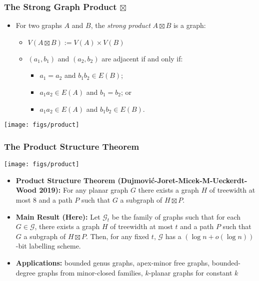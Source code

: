 \documentclass[xcolor=dvipsnames]{beamer}
\begin{document}
\begin{frame}
    \frametitle{The Strong Graph Product $\boxtimes$}

    \begin{itemize}
        \item[] For two graphs $A$ and $B$, the \emph{strong product} $A\boxtimes B$ is a graph:
        \begin{itemize}
            \item $V(A\boxtimes B):=V(A)\times V(B)$
            \item $(a_1,b_1)$ and $(a_2,b_2)$ are adjacent if and only if:
            \begin{itemize}
                \item $a_1=a_2$ and $b_1b_2\in E(B)$;
                \item $a_1a_2 \in E(A)$ and $b_1=b_2$; or
                \item  $a_1a_2 \in E(A)$ and $b_1b_2 \in E(B)$.
            \end{itemize}
        \end{itemize}
    \end{itemize}
    \begin{center}
        \texttt{[image: figs/product]}
    \end{center}
\end{frame}


\begin{frame}
    \frametitle{The Product Structure Theorem}

    \begin{center}
        \texttt{[image: figs/product]}
    \end{center}

    \begin{itemize}
        \item<+->\textbf{Product Structure Theorem (Dujmović-Joret-Micek-M-Ueckerdt-Wood 2019):} For any planar graph $G$ there exists a graph $H$ of treewidth at most $8$ and a path $P$ such that $G$ a subgraph of $H\boxtimes P$.

        \item<+->\textbf{Main Result (Here):} Let $\mathcal{G}_t$ be the family of graphs such that for each $G\in\mathcal{G}$, there exists a graph $H$ of treewidth at most $t$ and a path $P$ such that $G$ a subgraph of $H\boxtimes P$.  Then, for any fixed $t$, $\mathcal{G}$ has a $(\log n + o(\log n))$-bit labelling scheme.

        \item<+->\textbf{Applications:} bounded genus graphs, apex-minor free graphs, bounded-degree graphs from minor-closed families, $k$-planar graphs for constant $k$
    \end{itemize}
\end{frame}
\end{document}
